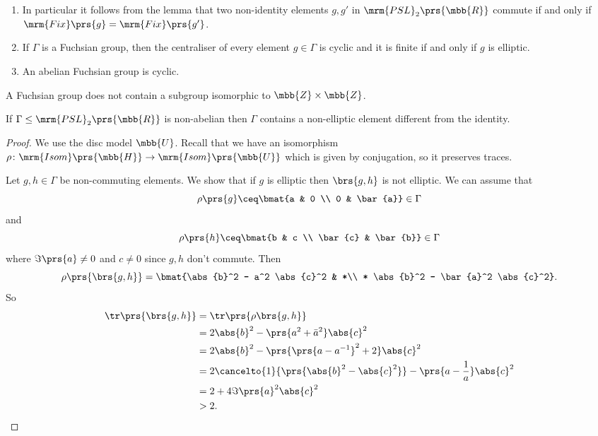 \documentclass[10pt, twoside]{book}
\begin{document}
\begin{remark}
\begin{enumerate}
\item In particular it follows from the lemma that two non-identity elements $g, g'$ in $\mrm{PSL}_2\prs{\mbb{R}}$ commute if and only if $\mrm{Fix}\prs{g} = \mrm{Fix}\prs{g'}$.

\item If $\Gamma$ is a Fuchsian group, then the centraliser of every element $g \in \Gamma$ is cyclic and it is finite if and only if $g$ is elliptic.

\item An abelian Fuchsian group is cyclic.
\end{enumerate}
\end{remark}

\begin{example}
A Fuchsian group does not contain a subgroup isomorphic to $\mbb{Z} \times \mbb{Z}$.
\end{example}

\begin{lemma}
If $\Gamma \leq \mrm{PSL}_2\prs{\mbb{R}}$ is non-abelian then $\Gamma$ contains a non-elliptic element different from the identity.
\end{lemma}

\begin{proof}
We use the disc model $\mbb{U}$. Recall that we have an isomorphism $\rho \colon \mrm{Isom}\prs{\mbb{H}} \to \mrm{Isom}\prs{\mbb{U}}$ which is given by conjugation, so it preserves traces.

Let $g,h \in \Gamma$ be non-commuting elements. We show that if $g$ is elliptic then $\brs{g,h}$ is not elliptic. We can assume that
\[\rho\prs{g} \ceq \bmat{a & 0 \\ 0 & \bar{a}} \in \Gamma\]
and
\[\rho\prs{h} \ceq \bmat{b & c \\ \bar{c} & \bar{b}} \in \Gamma\]
where $\Im\prs{a} \neq 0$ and $c \neq 0$ since $g,h$ don't commute.
Then
\[\rho\prs{\brs{g,h}} = \bmat{\abs{b}^2 - a^2  \abs{c}^2 & *\\ * \abs{b}^2 - \bar{a}^2 \abs{c}^2} \text{.}\]
So
\begin{align*}
\tr\prs{\brs{g,h}} &=
\tr\prs{\rho\brs{g,h}}
\\&= 2 \abs{b}^2 - \prs{a^2 + \bar{a}^2}  \abs{c}^2
\\&= 2 \abs{b}^2 - \prs{\prs{a- a^{-1}}^2 + 2} \abs{c}^2
\\&= 2 \cancelto{1}{\prs{\abs{b}^2 - \abs{c}^2}} - \prs{a - \frac{1}{a}} \abs{c}^2
\\&= 2 + 4 \Im\prs{a}^2 \abs{c}^2
\\&> 2 \text{.}
\end{align*}
\end{proof}
\end{document}
